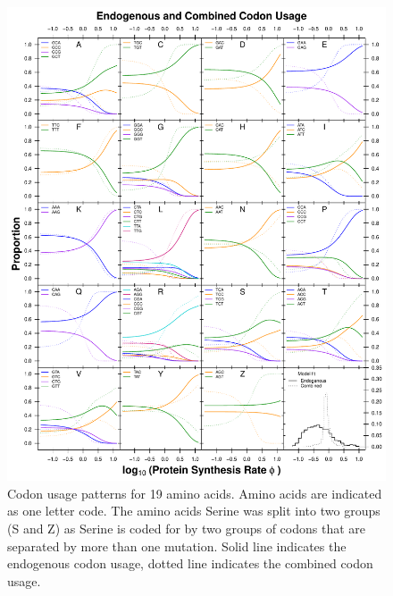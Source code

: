 \documentclass[doublespacing,linenumbers]{bmcart-modified}
\begin{document}
\begin{backmatter}
\begin{figure}
     \centering
	\includegraphics[width=\textwidth]{img/figS2.pdf}%
	\caption{Codon usage patterns for 19 amino acids. Amino acids are indicated as one letter code. 
	The amino acids Serine was split into two groups (S and Z) as Serine is coded for by two groups of codons that are separated by more than one mutation.
	Solid line indicates the endogenous codon usage, dotted line indicates the combined codon usage.}
	\label{fig:cub_full_main}
\end{figure}
\null
\vfill
\begin{figure}
     \centering

\end{figure}
\end{backmatter}
\end{document}

